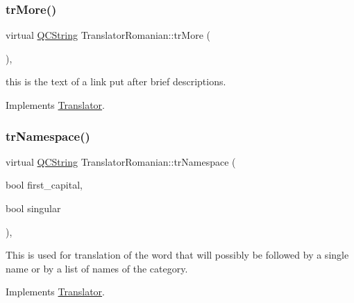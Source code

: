 \mbox{\label{class_translator_romanian_af6df9d4164283ccf1b78e5a4c5c44dc0}} 
\subsubsection{\texorpdfstring{trMore()}{trMore()}}
{\footnotesize\ttfamily virtual \mbox{\hyperlink{class_q_c_string}{Q\+C\+String}} Translator\+Romanian\+::tr\+More (\begin{DoxyParamCaption}{ }\end{DoxyParamCaption})\hspace{0.3cm}{\ttfamily [inline]}, {\ttfamily [virtual]}}

this is the text of a link put after brief descriptions. 

Implements \mbox{\hyperlink{class_translator}{Translator}}.

\mbox{\label{class_translator_romanian_abd8b64782610d8656def06e32a56a633}} 
\subsubsection{\texorpdfstring{trNamespace()}{trNamespace()}}
{\footnotesize\ttfamily virtual \mbox{\hyperlink{class_q_c_string}{Q\+C\+String}} Translator\+Romanian\+::tr\+Namespace (\begin{DoxyParamCaption}\item[{bool}]{first\+\_\+capital,  }\item[{bool}]{singular }\end{DoxyParamCaption})\hspace{0.3cm}{\ttfamily [inline]}, {\ttfamily [virtual]}}

This is used for translation of the word that will possibly be followed by a single name or by a list of names of the category. 

Implements \mbox{\hyperlink{class_translator}{Translator}}.

\mbox{\label{class_translator_romanian_ab542cfc92b765bb9fce05b02439782bb}} 

